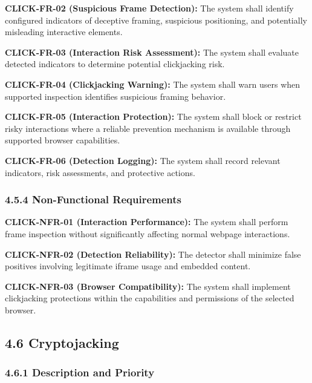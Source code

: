 \documentclass[12pt,a4paper]{report}
\let\originaladdcontentsline\addcontentsline
\renewcommand{\addcontentsline}[3]{\phantomsection\originaladdcontentsline{#1}{#2}{#3}}
\begin{document}
\textbf{CLICK-FR-02 (Suspicious Frame Detection):} The system shall identify configured indicators of deceptive framing, suspicious positioning, and potentially misleading interactive elements.\par

\textbf{CLICK-FR-03 (Interaction Risk Assessment):} The system shall evaluate detected indicators to determine potential clickjacking risk.\par

\textbf{CLICK-FR-04 (Clickjacking Warning):} The system shall warn users when supported inspection identifies suspicious framing behavior.\par

\textbf{CLICK-FR-05 (Interaction Protection):} The system shall block or restrict risky interactions where a reliable prevention mechanism is available through supported browser capabilities.\par

\textbf{CLICK-FR-06 (Detection Logging):} The system shall record relevant indicators, risk assessments, and protective actions.\par

\subsubsection*{4.5.4 Non-Functional Requirements}

\textbf{CLICK-NFR-01 (Interaction Performance):} The system shall perform frame inspection without significantly affecting normal webpage interactions.\par

\textbf{CLICK-NFR-02 (Detection Reliability):} The detector shall minimize false positives involving legitimate iframe usage and embedded content.\par

\textbf{CLICK-NFR-03 (Browser Compatibility):} The system shall implement clickjacking protections within the capabilities and permissions of the selected browser.\par

\subsection*{4.6 Cryptojacking}

\subsubsection*{4.6.1 Description and Priority}
\end{document}

